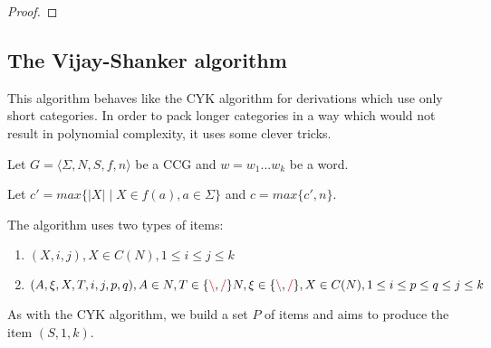 \documentclass[12pt]{extarticle}
\theoremstyle{definition} \newtheorem{defn}{Definition}
\theoremstyle{definition} \newtheorem{prop}{Proposition}
\theoremstyle{definition} \newtheorem{property}{Property}
\newcommand{\lc}{\textcolor{red}{\backslash}}
\newcommand{\rc}{\textcolor{red}{/}}
\begin{document}
\begin{proof}
\end{proof}

\subsection{The Vijay-Shanker algorithm}

This algorithm behaves like the CYK algorithm for derivations which use only
short categories. In order to pack longer categories in a way which would not
result in polynomial complexity, it uses some clever tricks.

Let $ G = \langle \Sigma, N, S, f, n \rangle $ be a CCG and $w = w_1 ... w_k$
be a word.

Let $c' = max \{ |X| \mid X \in f(a), a \in \Sigma \}$ and $c = max \{ c', n \}$.

The algorithm uses two types of items:
\begin{enumerate}
    \item $(X, i, j), X \in C(N), 1 \leq i \leq j \leq k$
    \item $(A, \xi, X, T, i, j, p, q), A \in N, T \in \{ \lc, \rc \} N, \xi \in \{ \lc, \rc \}, X \in C(N), 1 \leq i \leq p \leq q \leq j \leq k$
\end{enumerate}

As with the CYK algorithm, we build a set ${P}$ of items and aims to produce the item
$(S, 1, k)$.
\end{document}
